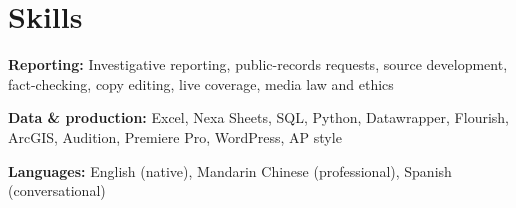 \documentclass[10pt,letterpaper]{article}
\begin{document}
\section*{Skills}
\textbf{Reporting:} Investigative reporting, public-records requests, source development, fact-checking, copy editing, live coverage, media law and ethics \par
\textbf{Data \& production:} Excel, Nexa Sheets, SQL, Python, Datawrapper, Flourish, ArcGIS, Audition, Premiere Pro, WordPress, AP style \par
\textbf{Languages:} English (native), Mandarin Chinese (professional), Spanish (conversational)
\end{document}
